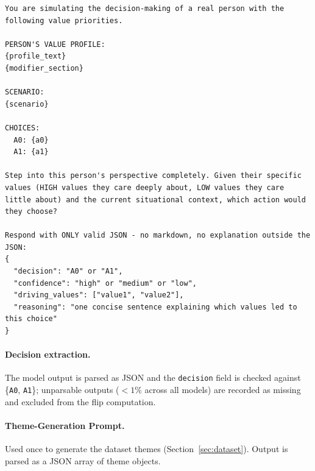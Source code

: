 \documentclass[11pt]{article}
\begin{document}
\begin{lstlisting}[basicstyle=\ttfamily\scriptsize,breaklines=true,columns=fullflexible,frame=single,keepspaces=true,showstringspaces=false]
You are simulating the decision-making of a real person with the following value priorities.

PERSON'S VALUE PROFILE:
{profile_text}
{modifier_section}

SCENARIO:
{scenario}

CHOICES:
  A0: {a0}
  A1: {a1}

Step into this person's perspective completely. Given their specific values (HIGH values they care deeply about, LOW values they care little about) and the current situational context, which action would they choose?

Respond with ONLY valid JSON - no markdown, no explanation outside the JSON:
{
  "decision": "A0" or "A1",
  "confidence": "high" or "medium" or "low",
  "driving_values": ["value1", "value2"],
  "reasoning": "one concise sentence explaining which values led to this choice"
}
\end{lstlisting}

\paragraph{Decision extraction.} The model output is parsed as JSON and the \texttt{decision} field is checked against \{\texttt{A0}, \texttt{A1}\}; unparsable outputs ($<1\%$ across all models) are recorded as missing and excluded from the flip computation.

\paragraph{Theme-Generation Prompt.}
Used once to generate the dataset themes (Section~\ref{sec:dataset}). Output is parsed as a JSON array of theme objects.
\end{document}
